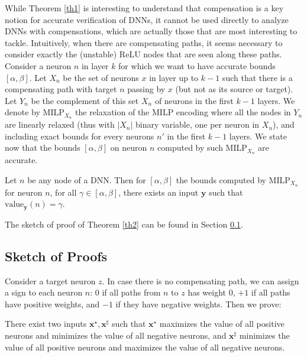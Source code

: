 \documentclass{llncs}
\newcommand{\vx}{\boldsymbol{x}}
\newcommand{\vy}{\boldsymbol{y}}
\newcommand{\val}{{\textrm{value}}}
\begin{document}
While Theorem \ref{th1} is interesting to understand that compensation is a key notion for accurate verification of DNNs, it cannot be used directly to analyze DNNs with compensations, which are actually those that are most interesting to tackle.
Intuitively, when there are compensating paths, it seems necessary to consider exactly the (unstable) ReLU nodes that are seen along these paths. 
Consider a neuron $n$ in layer $k$ for which we want to have accurate bounds 
$[\alpha,\beta]$.
Let $X_n$ be the set of neurons $x$ in layer up to $k-1$ such that there is a compensating path with target $n$ passing by $x$ (but not as its source or target). Let $Y_n$ be the complement of this set $X_n$ of neurons in the first $k-1$ layers. We denote by MILP$_{X_n}$ the relaxation of the MILP encoding where all the nodes in $Y_n$ are linearly relaxed (thus with $|X_n|$ binary variable, one per neuron in $X_n$), and including exact bounds for every neurons $n'$ in the first $k-1$ layers. We state now that the bounds $[\alpha,\beta]$ on neuron $n$ computed by such MILP$_{X_n}$ are accurate.

\begin{theorem}
	\label{th2} 
	Let $n$ be any node of a DNN. Then for $[\alpha,\beta]$ the bounds computed by MILP$_{X_n}$ for neuron $n$, for all $\gamma \in [\alpha,\beta]$, there exists an input $\vy$ such that $\val_{\vy}(n)=\gamma$.
\end{theorem}

The sketch of proof of Theorem \ref{th2} can be found in Section \ref{sec.proofs}.


\subsection{Sketch of Proofs}
\label{sec.proofs}

Consider a target neuron $z$.
In case there is no compensating path, we can assign a sign to each neuron $n$: 0
if all paths from $n$ to $z$ has weight 0, $+1$ if all paths have positive weights, and 
$-1$ if they have negative weights. Then we prove:

\begin{proposition}
	\label{prop.sign}
There exist two inputs $\vx^\star,\vx^\sharp$ such that ${\vx^\star}$ maximizes the value of all positive neurons and minimizes the value of all negative neurons, and  ${\vx^\sharp}$ minimizes the value of all positive neurons and maximizes the value of all negative neurons.
\end{proposition}
\end{document}
